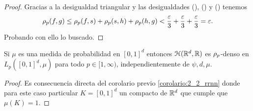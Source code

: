 \begin{proof}
    Gracias a la desigualdad triangular y las desigualdades
    (),
    () y 
    ()
    tenemos
    \begin{equation}
        \rho_{p}(f,g) 
        \leq
            \rho_{p}(f,s)
            +\rho_{p}(s,h)
            + \rho_{p}(h,g)
        < 
        \frac{\varepsilon}{3} + \frac{\varepsilon}{3} + \frac{\varepsilon}{3}
        = \varepsilon.
    \end{equation}
Probando con ello lo buscado. 
\end{proof}  

\begin{corolario}\label{corolario:2_3_medida_probabilidad}
    Si $\mu$ es una medida de probabilidad en $[0,1]^d$
    entonces 
    $\mathcal{H}(\mathbb{R}^d,\mathbb{R})$ es $\rho_{p}$-denso en 
    $L_p([0,1]^d, \mu)$ para todo $p \in [1, \infty)$,
    independientemente de $\psi, d, \mu$. 
\end{corolario}



\begin{proof}
    Es consecuencia directa del corolario previo \ref{corolario:2_2_rrnn}
    donde para este caso particular $K = [0,1]^d$ un compacto
    de $\mathbb{R}^d$
    que cumple que $\mu(K) = 1.$
\end{proof}

